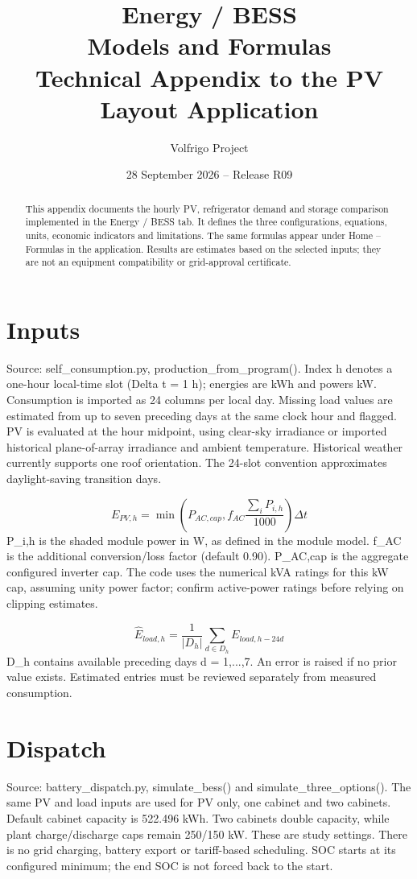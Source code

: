 \documentclass[10pt,a4paper]{article}
\title{Energy / BESS\\Models and Formulas\\\large Technical Appendix to the PV Layout Application}
\author{Volfrigo Project}
\date{28 September 2026 -- Release R09}
\begin{document}
\maketitle
\begin{abstract}
This appendix documents the hourly PV, refrigerator demand and storage comparison implemented in the Energy / BESS tab. It defines the three configurations, equations, units, economic indicators and limitations. The same formulas appear under Home -- Formulas in the application. Results are estimates based on the selected inputs; they are not an equipment compatibility or grid-approval certificate.
\end{abstract}
\tableofcontents
\newpage
\section{Inputs}
Source: self\_consumption.py, production\_from\_program(). Index h denotes a one-hour local-time slot (Delta t = 1 h); energies are kWh and powers kW. Consumption is imported as 24 columns per local day. Missing load values are estimated from up to seven preceding days at the same clock hour and flagged. PV is evaluated at the hour midpoint, using clear-sky irradiance or imported historical plane-of-array irradiance and ambient temperature. Historical weather currently supports one roof orientation. The 24-slot convention approximates daylight-saving transition days.

\begin{equation}
E_{PV,h}=\min\left(P_{AC,cap},f_{AC}\frac{\sum_iP_{i,h}}{1000}\right)\Delta t
\end{equation}
P\_i,h is the shaded module power in W, as defined in the module model. f\_AC is the additional conversion/loss factor (default 0.90). P\_AC,cap is the aggregate configured inverter cap. The code uses the numerical kVA ratings for this kW cap, assuming unity power factor; confirm active-power ratings before relying on clipping estimates.

\begin{equation}
\widehat E_{load,h}=\frac{1}{|D_h|}\sum_{d\in D_h}E_{load,h-24d}
\end{equation}
D\_h contains available preceding days d = 1,...,7. An error is raised if no prior value exists. Estimated entries must be reviewed separately from measured consumption.

\section{Dispatch}
Source: battery\_dispatch.py, simulate\_bess() and simulate\_three\_options(). The same PV and load inputs are used for PV only, one cabinet and two cabinets. Default cabinet capacity is 522.496 kWh. Two cabinets double capacity, while plant charge/discharge caps remain 250/150 kW. These are study settings. There is no grid charging, battery export or tariff-based scheduling. SOC starts at its configured minimum; the end SOC is not forced back to the start.
\end{document}

